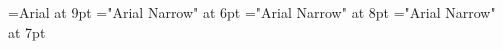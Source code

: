 \font\helv=Arial at 9pt
\font\helvx="Arial Narrow" at 6pt
\font\helvy="Arial Narrow" at 8pt
\font\helvz="Arial Narrow" at 7pt

\def\ofs#1#2#3{}
\let\ofspc\pcxxv
\let\redpc\pcfee
\let\newgh\pcblu

\long{}

\let\pageno\page

\newcount\ltfirstpage



  \pcsltabinit
  \nocotabinit
 \seqdbtabinit


\def\Hstrut{\vrule height12pt depth5pt width0pt}
\def\tvrule{\vrule}
\def\tvrulex{\vrule width1pt\relax}
\def\tablerule{\noalign{\allowbreak\hrule}}
\def\thead{\Sans\nine\rm}
\def\theadrule{\noalign{\hrule height1pt\relax}}
\def\tbodybreak{\noalign{\allowbreak}}

\let\fourteen\Large
\let\twelve\large
\let\ten\normal
\let\nine\small
\let\eight\small
\let\seven\small
\let\six\footnotesize

\let\Sans\sf

\def\Hsub#1{#1}

\def\cdlighnopng{\vbox{\vfil\hbox{(-)\hfil}\vfil}}

\def\cvi{\pcseqi}
\def\cvii{\pcseqii}
\def\cviii{\pcseqiii}
\def\cviv{\pcseqiv}
\def\cvv{\pcseqv}
\def\cvvi{\pccvvi}
\def\cvxcix{\pccvxcix}
\def\cvxcviii{\pccvxcviii}

\def\cv#1#2{%
  \ifnum#2=1\cvi
  \else
    \ifnum#2=2\cvii
    \else
      \ifnum#2=3\cviii
      \else
        \ifnum#2=4\cviv
        \else
          \ifnum#2=5\cvv
          \else
            \ifnum#2=6\cvvi
            \else
              \ifnum#2=8\cvxcviii
              \else
                \ifnum#2=9\cvxcix\fi
              \fi
            \fi
          \fi
        \fi
      \fi
    \fi
  \fi
}


\def\beginDisplay{\begingroup\narrower}
\def\endDisplay{\endgroup}

\let\preamble\relax
\let\sectionsintocfalse\relax
\let\subsectionsintocfalse\relax
\let\useapp\relax

\def\xgraphicsfigure#1#2#3#4{}


\let\ccempty\relax

\def\code#1{{\small\sf#1}}

\let\NaN\relax

